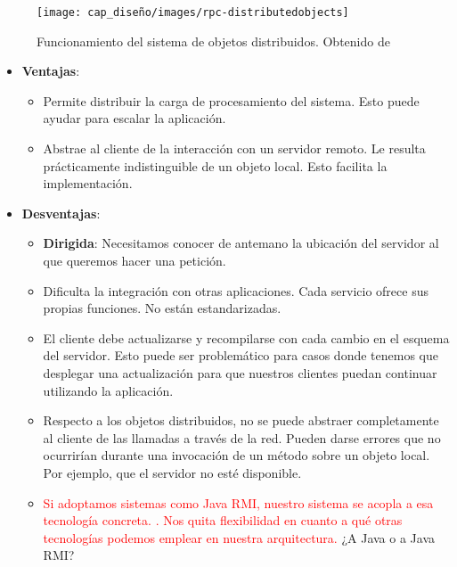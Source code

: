 \begin{figure}[htb]
  \centering
  \texttt{[image: cap\_diseño/images/rpc-distributedobjects]}
  \caption[Funcionamiento del sistema de objetos distribuidos.]{Funcionamiento del sistema de objetos distribuidos. Obtenido de \cite{tanenbaumChapter10Distributed2007}}
  \label{fig:rpc-distributedobjects}
\end{figure}

\begin{itemize}
  \item \textbf{Ventajas}:
  \begin{itemize}
    \item Permite distribuir la carga de procesamiento del sistema. Esto puede ayudar para escalar la aplicación.

    \item Abstrae al cliente de la interacción con un servidor remoto. Le resulta prácticamente indistinguible de un objeto local. Esto facilita la implementación.

  \end{itemize}

  \item \textbf{Desventajas}:
  \begin{itemize}
    \item \textbf{Dirigida}: Necesitamos conocer de antemano la ubicación del servidor al que queremos hacer una petición.

    \item Dificulta la integración con otras aplicaciones. Cada servicio ofrece sus propias funciones. No están estandarizadas.

    \item El cliente debe actualizarse y recompilarse con cada cambio en el esquema del servidor. Esto puede ser problemático para casos donde tenemos que desplegar una actualización para que nuestros clientes puedan continuar utilizando la aplicación.

    \item Respecto a los objetos distribuidos, no se puede abstraer completamente al cliente de las llamadas a través de la red. Pueden darse errores que no ocurrirían durante una invocación de un método sobre un objeto local. Por ejemplo, que el servidor no esté disponible. \cite{jausovecFallaciesDistributedSystems2020}

    \item \textcolor{red}{Si adoptamos sistemas como Java RMI, nuestro sistema se acopla a esa tecnología concreta. \cite{newmanBuildingMicroservicesDesigning2021}. Nos quita flexibilidad en cuanto a qué otras tecnologías podemos emplear en nuestra arquitectura.} ¿A Java o a Java RMI?
  \end{itemize}
\end{itemize}

